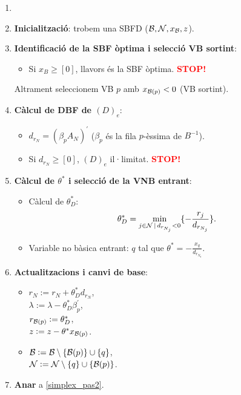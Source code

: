 \begin{alg}
    \begin{enumerate}
        \item[]
        \item {\bf Inicialització}: trobem una SBFD ($\mathcal{B}, \mathcal{N}, x_{\mathcal{B}}, z$).
        \item \label{simplex_pas2} {\bf Identificació de la SBF òptima i selecció VB sortint}:
            \begin{itemize}
                \item Si $x_B \geq [0]$, llavors és la SBF òptima. \textcolor{red}{\bf STOP!}
            \end{itemize}
            Altrament seleccionem VB $p$ amb $x_{\mathcal{B}(p)} < 0$ (VB sortint).
        \item {\bf Càlcul de DBF de $(D)_e$}:
            \begin{itemize}
                \item $d_{r_N} = (\beta_p A_N)^\prime$ ($\beta_p$ és la fila $p$-èssima de $B^{-1}$).
                \item Si $d_{r_N} \geq [0]$, $(D)_e$ il·limitat. \textcolor{red}{\bf STOP!}
            \end{itemize}
        \item {\bf Càlcul de $\theta^*$ i selecció de la VNB entrant}:
            \begin{itemize}
                \item Càlcul de $\theta_D^*$: 
                    \[\theta_D^* = \min_{j \in \mathcal{N} \,|\, d_{r_{N_j}} < 0} \{-\frac{r_j}{d_{r_{N_j}}} \}.\]
                \item Variable no bàsica entrant: $q$ tal que $\theta^* = -\frac{x_q}{d_{r_{N_q}}}$.
            \end{itemize}
        \item {\bf Actualitzacions i canvi de base}:
            \begin{itemize}
                \item $r_N := r_N + \theta_D^* d_{r_N}$, \\
                    $\lambda := \lambda - \theta_D^* \beta_p^\prime$, \\
                    $r_{\mathcal{B}(p)} := \theta_D^*$, \\
                    $z := z - \theta^* x_{\mathcal{B}(p)}$.
                \item $\mathcal{B} := \mathcal{B} \setminus \{\mathcal{B}(p)\} \cup \{q\}$, \\
                    $\mathcal{N} := \mathcal{N} \setminus \{q\} \cup \{\mathcal{B}(p)\}$.
            \end{itemize}
        \item {\bf Anar} a \ref{simplex_pas2}.
    \end{enumerate}
\end{alg}
